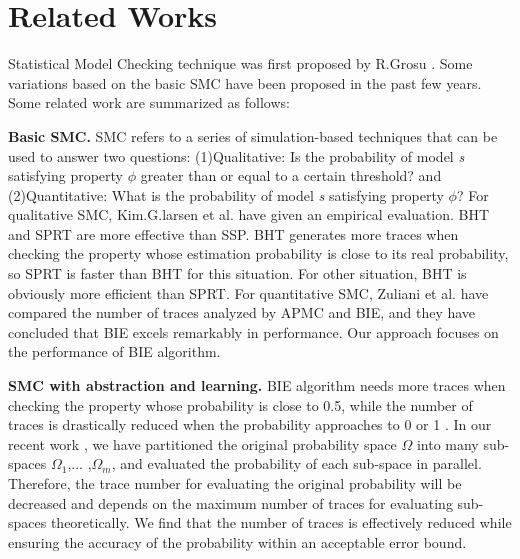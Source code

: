 \section{Related Works}
Statistical Model Checking technique was first proposed by R.Grosu \cite{grosu2005monte}. Some variations \cite{legay2010statistical} \cite{Younes2004Planning} \cite{younes2006statistical}\cite{jha2009bayesian} \cite{zuliani2013bayesian} \cite{herault2004} based on the basic SMC have been proposed in the past few years. Some related work are summarized as follows:

\textbf{Basic SMC.}
SMC refers to a series of simulation-based techniques that can be used to answer two questions: (1)Qualitative: Is the probability of model \emph{s} satisfying property $\phi$ greater than or equal to a certain threshold? and (2)Quantitative: What is the probability of model \emph{s} satisfying property $\phi$? For qualitative SMC, Kim.G.larsen et al. \cite{kim2012statistical} have given an empirical evaluation. BHT and SPRT are more effective than SSP. BHT generates more traces when checking the property whose estimation probability is close to its real probability, so SPRT is faster than BHT for this situation. For other situation, BHT is obviously more efficient than SPRT. For quantitative SMC, Zuliani et al. \cite{zuliani2013bayesian} have compared the number of traces analyzed by APMC and BIE, and they have concluded that BIE excels remarkably in performance. Our approach focuses on the performance of BIE algorithm.

\textbf{SMC with abstraction and learning.}
BIE algorithm needs more traces when checking the property whose probability is close to 0.5, while the number of traces is drastically reduced when the probability approaches to 0 or 1 \cite{zuliani2013bayesian}. In our recent work \cite{jiangkaiqiang2016}, we have partitioned the original probability space $\Omega$ into many sub-spaces $\Omega_1$,... ,$\Omega_m$, and evaluated the probability of each sub-space in parallel. Therefore, the trace number for evaluating the original probability will be decreased and depends on the maximum number of traces for evaluating sub-spaces theoretically. We find that the number of traces is effectively reduced while ensuring the accuracy of the probability within an acceptable error bound.

